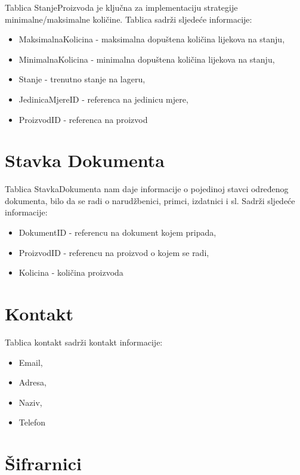 \documentclass[a4paper,12pt]{foi}
\begin{document}
Tablica Stanje\textunderscore Proizvoda je ključna za implementaciju strategije minimalne/maksimalne količine. Tablica sadrži sljedeće informacije: 

\begin{itemize}
	\item MaksimalnaKolicina - maksimalna dopuštena količina lijekova na stanju,
	\item MinimalnaKolicina -  minimalna dopuštena količina lijekova na stanju,
	\item Stanje - trenutno stanje na lageru,
	\item JedinicaMjereID - referenca na jedinicu mjere,
	\item ProizvodID - referenca na proizvod
\end{itemize}

\section{Stavka Dokumenta}

Tablica Stavka\textunderscore Dokumenta nam daje informacije o pojedinoj stavci određenog dokumenta, bilo da se radi o narudžbenici, primci, izdatnici i sl. Sadrži sljedeće informacije:

\begin{itemize}
	\item DokumentID - referencu na dokument kojem pripada,
	\item ProizvodID - referencu na proizvod o kojem se radi,
	\item Kolicina - količina proizvoda
\end{itemize}

\section{Kontakt}

Tablica kontakt sadrži kontakt informacije:

\begin{itemize}
	\item Email,
	\item Adresa,
	\item Naziv,
	\item Telefon
\end{itemize}

\section{Šifrarnici}
\end{document}
